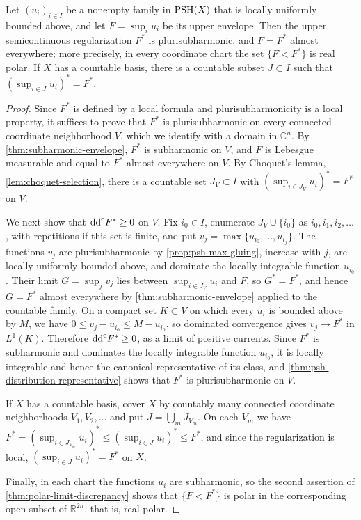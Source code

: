 \begin{theorem}\label{thm:psh-upper-envelopes}
Let $(u_i)_{i\in I}$ be a nonempty family in $\mathrm{PSH}(X)$ that is locally uniformly bounded above, and let $F=\sup_iu_i$ be its upper envelope. Then the upper semicontinuous regularization $F^*$ is plurisubharmonic, and $F=F^*$ almost everywhere; more precisely, in every coordinate chart the set $\{F<F^*\}$ is real polar. If $X$ has a countable basis, there is a countable subset $J\subset I$ such that $(\sup_{i\in J}u_i)^*=F^*$.
\end{theorem}
\begin{proof}
Since $F^*$ is defined by a local formula and plurisubharmonicity is a local property, it suffices to prove that $F^*$ is plurisubharmonic on every connected coordinate neighborhood $V$, which we identify with a domain in $\mathbb{C}^n$. By \cref{thm:subharmonic-envelope}, $F^*$ is subharmonic on $V$, and $F$ is Lebesgue measurable and equal to $F^*$ almost everywhere on $V$. By Choquet's lemma, \cref{lem:choquet-selection}, there is a countable set $J_V\subset I$ with $(\sup_{i\in J_V}u_i)^*=F^*$ on $V$.

We next show that $\mathrm{dd}^{\mathrm{c}} F^*\geq0$ on $V$. Fix $i_0\in I$, enumerate $J_V\cup\{i_0\}$ as $i_0,i_1,i_2,\ldots$, with repetitions if this set is finite, and put $v_j=\max\{u_{i_0},\ldots,u_{i_j}\}$. The functions $v_j$ are plurisubharmonic by \cref{prop:psh-max-gluing}, increase with $j$, are locally uniformly bounded above, and dominate the locally integrable function $u_{i_0}$. Their limit $G=\sup_jv_j$ lies between $\sup_{i\in J_V}u_i$ and $F$, so $G^*=F^*$, and hence $G=F^*$ almost everywhere by \cref{thm:subharmonic-envelope} applied to the countable family. On a compact set $K\subset V$ on which every $u_i$ is bounded above by $M$, we have $0\leq v_j-u_{i_0}\leq M-u_{i_0}$, so dominated convergence gives $v_j\to F^*$ in $L^1(K)$. Therefore $\mathrm{dd}^{\mathrm{c}} F^*\geq0$, as a limit of positive currents. Since $F^*$ is subharmonic and dominates the locally integrable function $u_{i_0}$, it is locally integrable and hence the canonical representative of its class, and \cref{thm:psh-distribution-representative} shows that $F^*$ is plurisubharmonic on $V$.

If $X$ has a countable basis, cover $X$ by countably many connected coordinate neighborhoods $V_1,V_2,\ldots$ and put $J=\bigcup_mJ_{V_m}$. On each $V_m$ we have $F^*=(\sup_{i\in J_{V_m}}u_i)^*\leq(\sup_{i\in J}u_i)^*\leq F^*$, and since the regularization is local, $(\sup_{i\in J}u_i)^*=F^*$ on $X$.

Finally, in each chart the functions $u_i$ are subharmonic, so the second assertion of \cref{thm:polar-limit-discrepancy} shows that $\{F<F^*\}$ is polar in the corresponding open subset of $\mathbb R^{2n}$, that is, real polar.
\end{proof}


